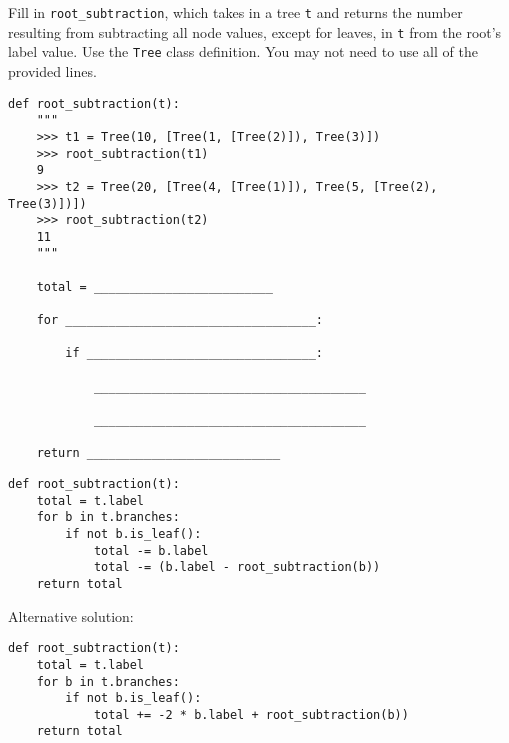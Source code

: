 \question
Fill in \lstinline{root_subtraction}, which takes in a tree \lstinline{t} and returns the number resulting from subtracting all node values, except for leaves, in \lstinline{t} from the root's label value. Use the \lstinline{Tree} class definition. You may not need to use all of the provided lines.

\begin{lstlisting}
def root_subtraction(t):
    """
    >>> t1 = Tree(10, [Tree(1, [Tree(2)]), Tree(3)])
    >>> root_subtraction(t1)
    9
    >>> t2 = Tree(20, [Tree(4, [Tree(1)]), Tree(5, [Tree(2), Tree(3)])])
    >>> root_subtraction(t2)
    11
    """

    total = _________________________

    for ___________________________________:

        if ________________________________:

            ______________________________________

            ______________________________________

    return ___________________________
\end{lstlisting}

\begin{solution}
\begin{lstlisting}
def root_subtraction(t):
    total = t.label
    for b in t.branches:
        if not b.is_leaf():
            total -= b.label
            total -= (b.label - root_subtraction(b))
    return total
\end{lstlisting}
Alternative solution:
\begin{lstlisting}
def root_subtraction(t):
    total = t.label
    for b in t.branches:
        if not b.is_leaf():
            total += -2 * b.label + root_subtraction(b))
    return total
\end{lstlisting}
\end{solution}